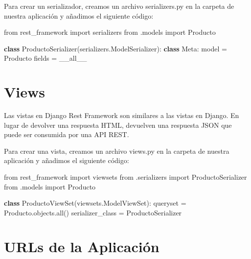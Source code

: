 \documentclass[
  a4paper,
  DIV=11,
  numbers=noendperiod,
  onepage,
  openany]{scrreprt}
\newenvironment{Shaded}{\begin{snugshade}}{\end{snugshade}}
\newcommand{\BuiltInTok}[1]{\textcolor[rgb]{0.00,0.23,0.31}{#1}}
\newcommand{\ImportTok}[1]{\textcolor[rgb]{0.00,0.46,0.62}{#1}}
\newcommand{\KeywordTok}[1]{\textcolor[rgb]{0.00,0.23,0.31}{\textbf{#1}}}
\newcommand{\NormalTok}[1]{\textcolor[rgb]{0.00,0.23,0.31}{#1}}
\newcommand{\OperatorTok}[1]{\textcolor[rgb]{0.37,0.37,0.37}{#1}}
\newcommand{\StringTok}[1]{\textcolor[rgb]{0.13,0.47,0.30}{#1}}
\begin{document}
\begin{tcolorbox}
Para crear un serializador, creamos un archivo serializers.py en la
carpeta de nuestra aplicación y añadimos el siguiente código:

\begin{Shaded}
\begin{Highlighting}[]
\ImportTok{from}\NormalTok{ rest\_framework }\ImportTok{import}\NormalTok{ serializers}
\ImportTok{from}\NormalTok{ .models }\ImportTok{import}\NormalTok{ Producto}

\KeywordTok{class}\NormalTok{ ProductoSerializer(serializers.ModelSerializer):}
    \KeywordTok{class}\NormalTok{ Meta:}
\NormalTok{        model }\OperatorTok{=}\NormalTok{ Producto}
\NormalTok{        fields }\OperatorTok{=} \StringTok{\textquotesingle{}\_\_all\_\_\textquotesingle{}}
\end{Highlighting}
\end{Shaded}

\section{Views}\label{views}

Las vistas en Django Rest Framework son similares a las vistas en
Django. En lugar de devolver una respuesta HTML, devuelven una respuesta
JSON que puede ser consumida por una API REST.

Para crear una vista, creamos un archivo views.py en la carpeta de
nuestra aplicación y añadimos el siguiente código:

\begin{Shaded}
\begin{Highlighting}[]
\ImportTok{from}\NormalTok{ rest\_framework }\ImportTok{import}\NormalTok{ viewsets}
\ImportTok{from}\NormalTok{ .serializers }\ImportTok{import}\NormalTok{ ProductoSerializer}
\ImportTok{from}\NormalTok{ .models }\ImportTok{import}\NormalTok{ Producto}

\KeywordTok{class}\NormalTok{ ProductoViewSet(viewsets.ModelViewSet):}
\NormalTok{    queryset }\OperatorTok{=}\NormalTok{ Producto.objects.}\BuiltInTok{all}\NormalTok{()}
\NormalTok{    serializer\_class }\OperatorTok{=}\NormalTok{ ProductoSerializer}
\end{Highlighting}
\end{Shaded}

\section{URLs de la Aplicación}\label{urls-de-la-aplicaciuxf3n}


\end{tcolorbox}
\end{document}

